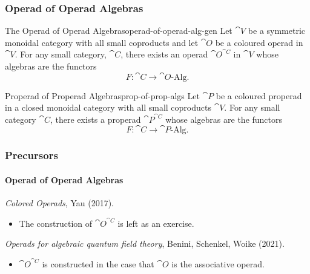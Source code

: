 \documentclass{beamer}
\begin{document}


\begin{frame}

\frametitle{Operad of Operad Algebras}

\begin{prop}{The Operad of Operad Algebras}{operad-of-operad-alg-gen}
Let $\cat{V}$ be a symmetric monoidal category with all small coproducts and let $\cat{O}$ be a coloured operad in $\cat{V}$. For any small category, $\cat{C}$, there exists an operad $\cat{O}^{\cat{C}}$ in $\cat{V}$ whose algebras are the functors 
\begin{equation*}
F: \cat{C} \to \cat{O} \text{-Alg}.
\end{equation*}
\end{prop}

\begin{prop}{Properad of Properad Algebras}{prop-of-prop-algs}
Let $\cat{P}$ be a coloured properad in a closed monoidal category with all small coproducts $\cat{V}$. For any small category $\cat{C}$, there exists a properad $\cat{P}^{\cat{C}}$ whose algebras are the functors
\begin{equation*}
F: \cat{C} \to \cat{P}\text{-Alg}.
\end{equation*}
\end{prop}


\end{frame}


\begin{frame}
\frametitle{Precursors}

\framesubtitle{Operad of Operad Algebras}


\textit{Colored Operads}, Yau (2017).

\begin{itemize}
\item The construction of $\cat{O}^{\cat{C}}$ is left as an exercise.
\end{itemize}


\bigskip



\textit{Operads for algebraic quantum field theory}, Benini, Schenkel, Woike (2021).

\begin{itemize}
\item $\cat{O}^{\cat{C}}$ is constructed in the case that $\cat{O}$ is the associative operad.

\end{itemize}





\end{frame}
\end{document}
